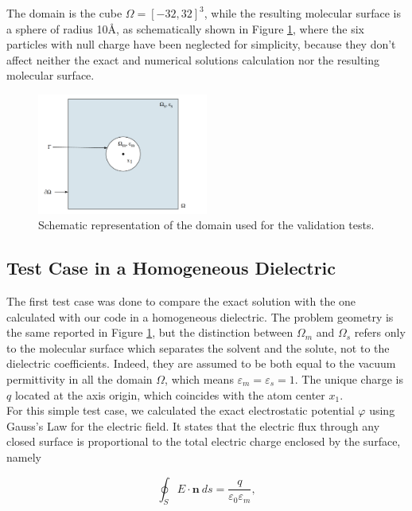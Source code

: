 \documentclass[11pt,a4paper]{article}
\begin{document}
The domain is the cube $\Omega = [-32, 32]^3$, while the resulting molecular surface is a sphere of radius 10\AA, as schematically shown in Figure \ref{fig:valid_dom}, where the six particles with null charge have been neglected for simplicity, because they don't affect neither the exact and numerical solutions calculation nor the resulting molecular surface.

\begin{figure}[H]
    \centering
    \includegraphics[width=0.5\textwidth]{Images/validat_dom.png}
    \caption{Schematic representation of the domain used for the validation tests.}
    \label{fig:valid_dom}
\end{figure}

\subsection{Test Case in a Homogeneous Dielectric}
The first test case was done to compare the exact solution with the one calculated with our code in a homogeneous dielectric. 
The problem geometry is the same reported in Figure \ref{fig:valid_dom}, but the distinction between $\Omega_m$ and $\Omega_s$ refers only to the molecular surface which separates the solvent and the solute, not to the dielectric coefficients. Indeed, they are assumed to be both equal to the vacuum permittivity in all the domain $\Omega$, which means $\varepsilon_m = \varepsilon_s = 1$. The unique charge is $q$ located at the axis origin, which coincides with the atom center $x_1$. \\
For this simple test case, we calculated the exact electrostatic potential $\varphi$ using Gauss's Law for the electric field. It states that the electric flux through any closed surface is proportional to the total electric charge enclosed by the surface, namely

\begin{equation}
    \oint_S E \cdot \mathbf{n}\ ds = \frac{q}{\varepsilon_0 \varepsilon_m},
    \label{eq:gauss_law}
\end{equation}
\end{document}
